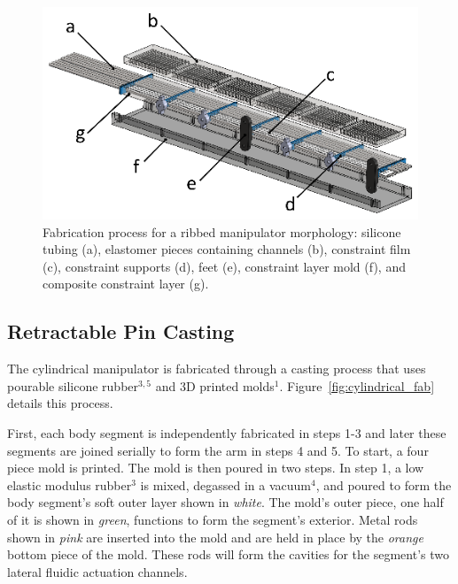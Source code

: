 \begin{figure}[htb]
\includegraphics[width=\columnwidth]{figures/fabrication/fab_ribbed_process.eps}
\caption[Fabrication process for a ribbed manipulator morphology]{Fabrication process for a ribbed manipulator morphology: silicone tubing (a), elastomer pieces containing channels (b), constraint film (c), constraint supports (d), feet (e), constraint layer mold (f), and composite constraint layer (g).}
\label{fig:ribbed fab process}
\end{figure}

\subsection{Retractable Pin Casting}
\label{subsec:Fabrication, Retractable Pin Casting}
The cylindrical manipulator is fabricated through a casting process that uses pourable silicone rubber$^{3,5}$ and 3D printed molds$^1$.
Figure~\ref{fig:cylindrical_fab} details this process.

First, each body segment is independently fabricated in steps 1-3 and later these segments are joined serially to form the arm in steps 4 and 5.
To start, a four piece mold is printed.
The mold is then poured in two steps.
In step 1, a low elastic modulus rubber$^3$ is mixed, degassed in a vacuum$^4$, and poured to form the body segment's soft outer layer shown in \emph{white}.
The mold's outer piece, one half of it is shown in \emph{green}, functions to form the segment's exterior.
Metal rods shown in \emph{pink} are inserted into the mold and are held in place by the \emph{orange} bottom piece of the mold.
These rods will form the cavities for the segment's two lateral fluidic actuation channels.

